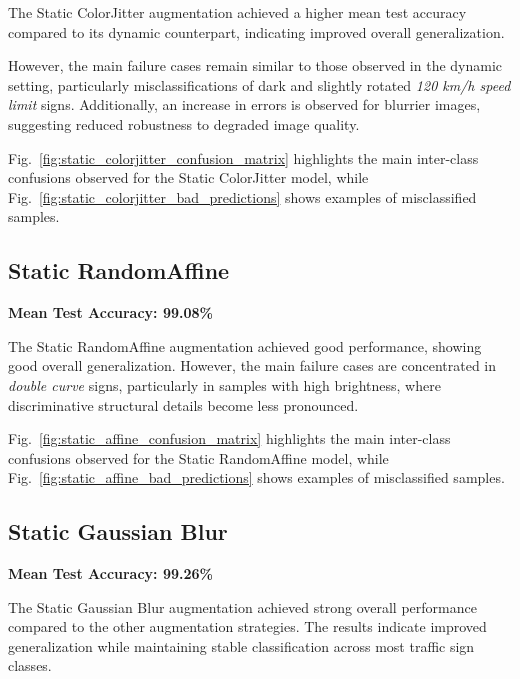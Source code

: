 \documentclass[conference]{IEEEtran}
\begin{document}
The Static ColorJitter augmentation achieved a higher mean test accuracy compared to its dynamic counterpart, indicating improved overall generalization.

However, the main failure cases remain similar to those observed in the dynamic setting, particularly misclassifications of dark and slightly rotated \textit{120 km/h speed limit} signs. Additionally, an increase in errors is observed for blurrier images, suggesting reduced robustness to degraded image quality.

Fig.~\ref{fig:static_colorjitter_confusion_matrix} highlights the main inter-class confusions observed for the Static ColorJitter model, while Fig.~\ref{fig:static_colorjitter_bad_predictions} shows examples of misclassified samples.









\subsection{Static RandomAffine}

\textbf{Mean Test Accuracy: 99.08\%}

The Static RandomAffine augmentation achieved good performance, showing good overall generalization. However, the main failure cases are concentrated in \textit{double curve} signs, particularly in samples with high brightness, where discriminative structural details become less pronounced.

Fig.~\ref{fig:static_affine_confusion_matrix} highlights the main inter-class confusions observed for the Static RandomAffine model, while Fig.~\ref{fig:static_affine_bad_predictions} shows examples of misclassified samples.









\subsection{Static Gaussian Blur}

\textbf{Mean Test Accuracy: 99.26\%}

The Static Gaussian Blur augmentation achieved strong overall performance compared to the other augmentation strategies. The results indicate improved generalization while maintaining stable classification across most traffic sign classes.
\end{document}
